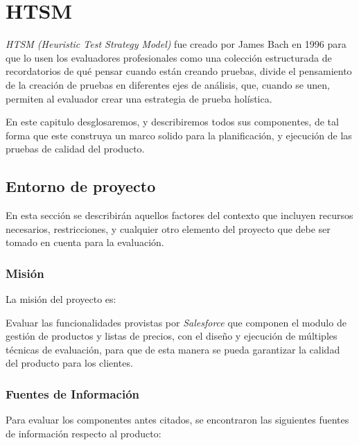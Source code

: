 \chapter{HTSM}

\emph{HTSM (Heuristic Test Strategy Model)} fue creado por James Bach en 1996
para que lo usen los evaluadores profesionales como una colección estructurada
de recordatorios de qué pensar cuando están creando pruebas, divide el
pensamiento de la creación de pruebas en diferentes ejes de análisis, que,
cuando se unen, permiten al evaluador crear una estrategia de prueba
holística\cite{Bach}.

En este capitulo desglosaremos, y describiremos todos sus componentes, de tal
forma que este construya un marco solido para la planificación, y ejecución de
las pruebas de calidad del producto.

\section{Entorno de proyecto}
En esta sección se describirán aquellos factores del contexto que incluyen
recursos necesarios, restricciones, y cualquier otro elemento del proyecto que
debe ser tomado en cuenta para la evaluación.

\subsection{Misión}
La misión del proyecto es:

Evaluar las funcionalidades provistas por \emph{Salesforce} que componen el
modulo de gestión de productos y listas de precios, con el diseño y ejecución de
múltiples técnicas de evaluación, para que de esta manera se pueda garantizar la
calidad del producto para los clientes.

\subsection{Fuentes de Información}
Para evaluar los componentes antes citados, se encontraron las siguientes
fuentes de información respecto al producto:

